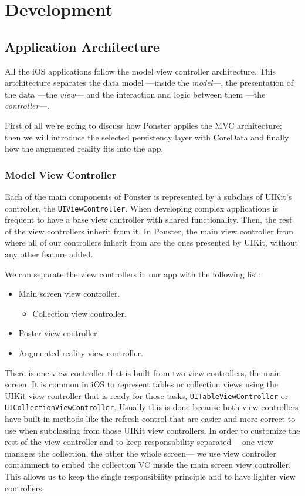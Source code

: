 \chapter{Development}
\section{Application Architecture}
\label{sec:architecture}
All the iOS applications follow the model view controller architecture. This
artchitecture separates the data model ---inside the \emph{model}---, the presentation
of the data ---the \emph{view}--- and the interaction and logic between them ---the
\emph{controller}---. 

First of all we're going to discuss how Ponster applies the MVC
architecture; then we will introduce the selected persistency layer with CoreData
and finally how the augmented reality fits into the app.

\subsection{Model View Controller}
Each of the main components of Ponster is represented by a subclass of UIKit's
controller, the \texttt{UIViewController}. When developing complex applications is
frequent to have a base view controller with shared functionality. Then, the rest of
the view controllers inherit from it. In Ponster, the main view controller from
where all of our controllers inherit from are the ones presented by UIKit, without
any other feature added. 

We can separate the view controllers in our app with the following list:
\begin{itemize}
\item Main screen view controller.
\begin{itemize}
\item Collection view controller.
\end{itemize}
\item Poster view controller
\item Augmented reality view controller.
\end{itemize}

There is one view controller that is built from two view controllers, the main
screen. It is common in iOS to represent tables or collection views using the UIKit
view controller that is ready for those tasks, \texttt{UITableViewController} or
\texttt{UICollectionViewController}. Usually this is done because both view
controllers have built-in methods like the refresh control that are easier and
more correct to use when subclassing from those UIKit view controllers. In order to
customize the rest of the view controller and to keep responsability separated ---one
view manages the collection, the other the whole screen--- we use
view controller containment to embed the collection VC inside the main screen view
controller. This allows us to keep the single responsibility principle and to have
lighter view controllers.

